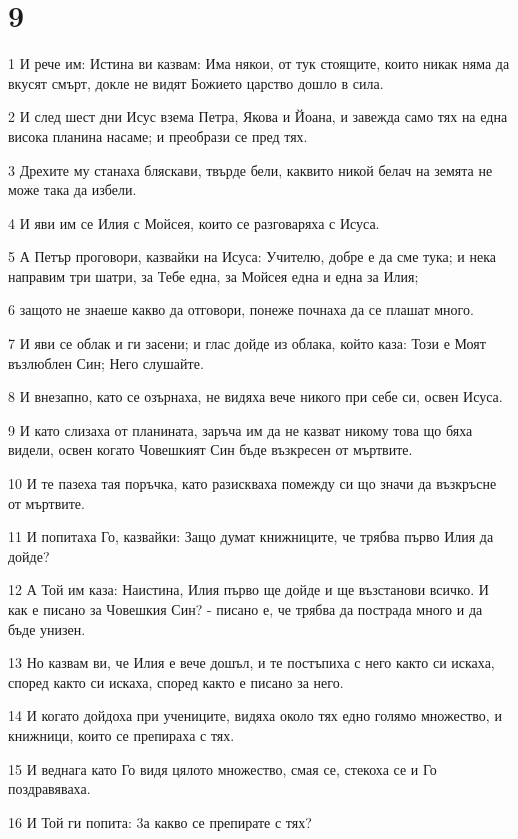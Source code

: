 \chapter{9}

\par 1 И рече им: Истина ви казвам: Има някои, от тук стоящите, които никак няма да вкусят смърт, докле не видят Божието царство дошло в сила.
\par 2 И след шест дни Исус взема Петра, Якова и Йоана, и завежда само тях на една висока планина насаме; и преобрази се пред тях.
\par 3 Дрехите му станаха бляскави, твърде бели, каквито никой белач на земята не може така да избели.
\par 4 И яви им се Илия с Мойсея, които се разговаряха с Исуса.
\par 5 А Петър проговори, казвайки на Исуса: Учителю, добре е да сме тука; и нека направим три шатри, за Тебе една, за Мойсея една и една за Илия;
\par 6 защото не знаеше какво да отговори, понеже почнаха да се плашат много.
\par 7 И яви се облак и ги засени; и глас дойде из облака, който каза: Този е Моят възлюблен Син; Него слушайте.
\par 8 И внезапно, като се озърнаха, не видяха вече никого при себе си, освен Исуса.
\par 9 И като слизаха от планината, заръча им да не казват никому това що бяха видели, освен когато Човешкият Син бъде възкресен от мъртвите.
\par 10 И те пазеха тая поръчка, като разискваха помежду си що значи да възкръсне от мъртвите.
\par 11 И попитаха Го, казвайки: Защо думат книжниците, че трябва първо Илия да дойде?
\par 12 А Той им каза: Наистина, Илия първо ще дойде и ще възстанови всичко. И как е писано за Човешкия Син? - писано е, че трябва да пострада много и да бъде унизен.
\par 13 Но казвам ви, че Илия е вече дошъл, и те постъпиха с него както си искаха, според както си искаха, според както е писано за него.
\par 14 И когато дойдоха при учениците, видяха около тях едно голямо множество, и книжници, които се препираха с тях.
\par 15 И веднага като Го видя цялото множество, смая се, стекоха се и Го поздравяваха.
\par 16 И Той ги попита: 3а какво се препирате с тях?
